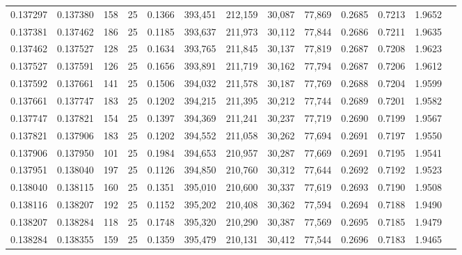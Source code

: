\begin{tabular}{rrrrrrrrrrrrr}
0.137297 & 0.137380 &   158 &  25 &                                     0.1366 & 393,451 & 212,159 &  30,087 &  77,869 & 0.2685 & 0.7213 & 1.9652 \\
0.137381 & 0.137462 &   186 &  25 &                                     0.1185 & 393,637 & 211,973 &  30,112 &  77,844 & 0.2686 & 0.7211 & 1.9635 \\
0.137462 & 0.137527 &   128 &  25 &                                     0.1634 & 393,765 & 211,845 &  30,137 &  77,819 & 0.2687 & 0.7208 & 1.9623 \\
0.137527 & 0.137591 &   126 &  25 &                                     0.1656 & 393,891 & 211,719 &  30,162 &  77,794 & 0.2687 & 0.7206 & 1.9612 \\
0.137592 & 0.137661 &   141 &  25 &                                     0.1506 & 394,032 & 211,578 &  30,187 &  77,769 & 0.2688 & 0.7204 & 1.9599 \\
0.137661 & 0.137747 &   183 &  25 &                                     0.1202 & 394,215 & 211,395 &  30,212 &  77,744 & 0.2689 & 0.7201 & 1.9582 \\
0.137747 & 0.137821 &   154 &  25 &                                     0.1397 & 394,369 & 211,241 &  30,237 &  77,719 & 0.2690 & 0.7199 & 1.9567 \\
0.137821 & 0.137906 &   183 &  25 &                                     0.1202 & 394,552 & 211,058 &  30,262 &  77,694 & 0.2691 & 0.7197 & 1.9550 \\
0.137906 & 0.137950 &   101 &  25 &                                     0.1984 & 394,653 & 210,957 &  30,287 &  77,669 & 0.2691 & 0.7195 & 1.9541 \\
0.137951 & 0.138040 &   197 &  25 &                                     0.1126 & 394,850 & 210,760 &  30,312 &  77,644 & 0.2692 & 0.7192 & 1.9523 \\
0.138040 & 0.138115 &   160 &  25 &                                     0.1351 & 395,010 & 210,600 &  30,337 &  77,619 & 0.2693 & 0.7190 & 1.9508 \\
0.138116 & 0.138207 &   192 &  25 &                                     0.1152 & 395,202 & 210,408 &  30,362 &  77,594 & 0.2694 & 0.7188 & 1.9490 \\
0.138207 & 0.138284 &   118 &  25 &                                     0.1748 & 395,320 & 210,290 &  30,387 &  77,569 & 0.2695 & 0.7185 & 1.9479 \\
0.138284 & 0.138355 &   159 &  25 &                                     0.1359 & 395,479 & 210,131 &  30,412 &  77,544 & 0.2696 & 0.7183 & 1.9465 \\

\end{tabular}
